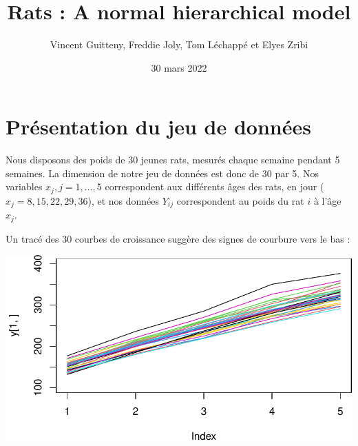 \documentclass[
]{article}
\title{Rats : A normal hierarchical model}
\author{Vincent Guitteny, Freddie Joly, Tom Léchappé et Elyes Zribi}
\date{30 mars 2022}
\begin{document}
\maketitle

\newenvironment{cols}[1][]{}{}
\newenvironment{col}[1]{\begin{minipage}{#1}\ignorespaces}{%
\end{minipage}
\ifhmode\unskip\fi
\aftergroup\useignorespacesandallpars}
\def\useignorespacesandallpars#1\ignorespaces\fi{%
#1\fi\ignorespacesandallpars}
\makeatletter
\def\ignorespacesandallpars{%
  \@ifnextchar\par
    {\expandafter\ignorespacesandallpars\@gobble}%
    {}%
}
\makeatother

\renewcommand\contentsname{Table des matières}
\newpage
\tableofcontents
\newpage

\hypertarget{pruxe9sentation-du-jeu-de-donnuxe9es}{%
\section{Présentation du jeu de
données}\label{pruxe9sentation-du-jeu-de-donnuxe9es}}

Nous disposons des poids de 30 jeunes rats, mesurés chaque semaine
pendant 5 semaines. La dimension de notre jeu de données est donc de 30
par 5. Nos variables \(x_j,j=1,…,5\) correspondent aux différents âges
des rats, en jour (\(x_j = {8,15,22,29,36}\)), et nos données \(Y_{ij}\)
correspondent au poids du rat \(i\) à l'âge \(x_j\).

Un tracé des 30 courbes de croissance suggère des signes de courbure
vers le bas :

\begin{center}\includegraphics{Rats---A-normal-hierarchical-model_files/figure-latex/unnamed-chunk-1-1} \end{center}
\end{document}
